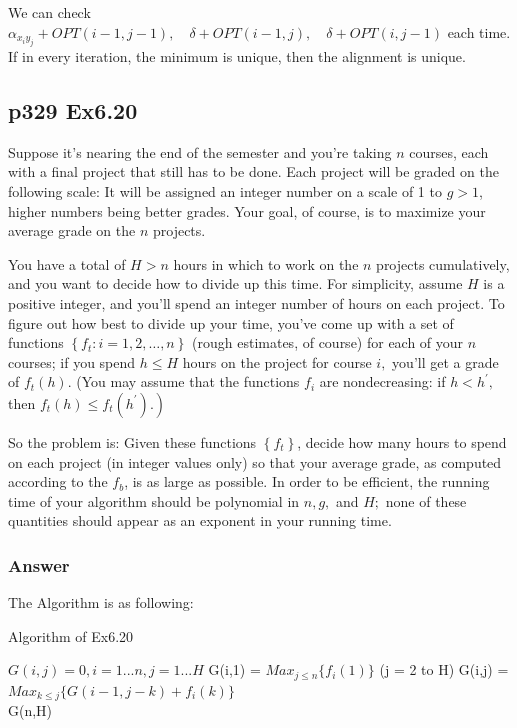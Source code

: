 \documentclass[a4paper]{article}
\begin{document}
We can check $\alpha_{x_{i} y_{j}}+O P T(i-1, j-1), \quad \delta+O P T(i-1, j), \quad \delta+O P T(i, j-1)$ each time. If in every iteration, the minimum is unique, then the alignment is unique.
\vspace{1cm}

\subsection*{p329 Ex6.20}
\begin{adjustwidth}{1cm}{1cm}
	Suppose it's nearing the end of the semester and you're taking $n$ courses, each with a final project that still has to be done. Each project will be graded on the following scale: It will be assigned an integer number on a scale of 1 to $g>1$, higher numbers being better grades. Your goal, of course, is to maximize your average grade on the $n$ projects.

	You have a total of $H>n$ hours in which to work on the $n$ projects cumulatively, and you want to decide how to divide up this time. For simplicity, assume $H$ is a positive integer, and you'll spend an integer number of hours on each project. To figure out how best to divide up your time, you've come up with a set of functions $\left\{f_{t}: i=1,2, \ldots, n\right\}$ (rough estimates, of course) for each of your $n$ courses; if you spend $h \leq H$ hours on the project for course $i,$ you'll get a grade of $f_{t}(h) .$ (You may assume that the functions $f_{i}$ are nondecreasing: if $h<h^{\prime},$ then $\left.f_{t}(h) \leq f_{t}\left(h^{\prime}\right) .\right)$

	So the problem is: Given these functions $\left\{f_{t}\right\}$, decide how many hours to spend on each project (in integer values only) so that your average grade, as computed according to the $f_{b}$, is as large as possible. In order to be efficient, the running time of your algorithm should be polynomial in $n, g,$ and $H ;$ none of these quantities should appear as an exponent in your running time.
\end{adjustwidth}

\subsubsection*{Answer}
The Algorithm is as following:
\begin{algorithm}[!htb]
	\caption{Algorithm of Ex6.20}
	\begin{algorithmic}[1]
		\State $G(i,j) = 0, i=1...n, j=1...H$
		G(i,1) = $Max_{j \leq n}\{f_i(1)\}$
		\For(j = 2 to H)
		\State G(i,j) = $Max_{k \leq j}\{G(i-1,j-k)+f_i(k)\}$
		\EndFor
		\EndFor\\
		\Return G(n,H)
		\EndFunction
	\end{algorithmic}
\end{algorithm}
\vspace{2cm}
\end{document}
